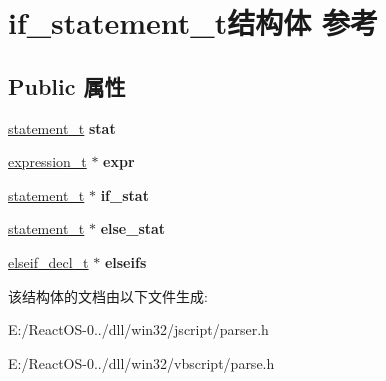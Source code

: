 \hypertarget{structif__statement__t}{}\section{if\+\_\+statement\+\_\+t结构体 参考}
\label{structif__statement__t}
\subsection*{Public 属性}
\begin{DoxyCompactItemize}
\item 
\mbox{\label{structif__statement__t_a04a967f1df251a077e17f836de1a0718}} 
\hyperlink{struct__statement__t}{statement\+\_\+t} {\bfseries stat}
\item 
\mbox{\label{structif__statement__t_a674e85cec22599854172fb3253dd6255}} 
\hyperlink{struct__expression__t}{expression\+\_\+t} $\ast$ {\bfseries expr}
\item 
\mbox{\label{structif__statement__t_a2701ac2b1678dc28ddd91f588e740ba2}} 
\hyperlink{struct__statement__t}{statement\+\_\+t} $\ast$ {\bfseries if\+\_\+stat}
\item 
\mbox{\label{structif__statement__t_abf22058dc79456fb401637077ab099a3}} 
\hyperlink{struct__statement__t}{statement\+\_\+t} $\ast$ {\bfseries else\+\_\+stat}
\item 
\mbox{\label{structif__statement__t_a50e3a7bdaf54e311b638d4dbfba361c3}} 
\hyperlink{struct__elseif__decl__t}{elseif\+\_\+decl\+\_\+t} $\ast$ {\bfseries elseifs}
\end{DoxyCompactItemize}


该结构体的文档由以下文件生成\+:\begin{DoxyCompactItemize}
\item 
E\+:/\+React\+O\+S-\/0../dll/win32/jscript/parser.\+h\item 
E\+:/\+React\+O\+S-\/0../dll/win32/vbscript/parse.\+h\end{DoxyCompactItemize}
